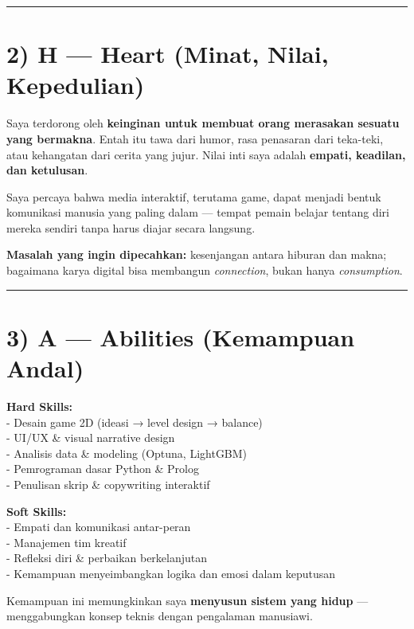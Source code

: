 \documentclass[
  letterpaper,
  DIV=11,
  numbers=noendperiod]{scrreprt}
\begin{document}
\begin{center}\rule{0.5\linewidth}{0.5pt}\end{center}

\section{2) H --- Heart (Minat, Nilai,
Kepedulian)}\label{h-heart-minat-nilai-kepedulian}

Saya terdorong oleh \textbf{keinginan untuk membuat orang merasakan
sesuatu yang bermakna}. Entah itu tawa dari humor, rasa penasaran dari
teka-teki, atau kehangatan dari cerita yang jujur. Nilai inti saya
adalah \textbf{empati, keadilan, dan ketulusan}.

Saya percaya bahwa media interaktif, terutama game, dapat menjadi bentuk
komunikasi manusia yang paling dalam --- tempat pemain belajar tentang
diri mereka sendiri tanpa harus diajar secara langsung.

\textbf{Masalah yang ingin dipecahkan:} kesenjangan antara hiburan dan
makna; bagaimana karya digital bisa membangun \emph{connection}, bukan
hanya \emph{consumption}.

\begin{center}\rule{0.5\linewidth}{0.5pt}\end{center}

\section{3) A --- Abilities (Kemampuan
Andal)}\label{a-abilities-kemampuan-andal}

\textbf{Hard Skills:}\\
- Desain game 2D (ideasi → level design → balance)\\
- UI/UX \& visual narrative design\\
- Analisis data \& modeling (Optuna, LightGBM)\\
- Pemrograman dasar Python \& Prolog\\
- Penulisan skrip \& copywriting interaktif

\textbf{Soft Skills:}\\
- Empati dan komunikasi antar-peran\\
- Manajemen tim kreatif\\
- Refleksi diri \& perbaikan berkelanjutan\\
- Kemampuan menyeimbangkan logika dan emosi dalam keputusan

Kemampuan ini memungkinkan saya \textbf{menyusun sistem yang hidup} ---
menggabungkan konsep teknis dengan pengalaman manusiawi.
\end{document}
